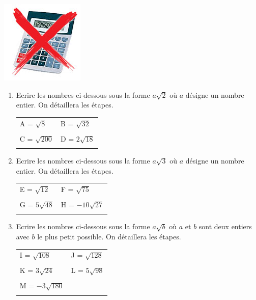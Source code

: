 
\begin{center}
\includegraphics[scale=0.2]{no_calculator}
\end{center}




\begin{exercice}
\begin{enumerate}
\item Ecrire les nombres ci-dessous sous la forme $a \sqrt{2}$  où $a$ désigne un nombre entier. On détaillera les étapes.\\

\begin{tabular}{m{3.8cm}m{3.5cm}}
A = $\sqrt{8}$ & B = $\sqrt{32}$\\
&\\
C = $\sqrt{200}$ & D = $2\sqrt{18}$\\
&\\

\end{tabular}

\item Ecrire les nombres ci-dessous sous la forme $a \sqrt{3}$  où $a$ désigne un nombre entier. On détaillera les étapes.

\begin{tabular}{m{3.8cm}m{3.5cm}}
E = $\sqrt{12}$ & F = $\sqrt{75}$\\
&\\
G = $5\sqrt{48}$ & H = $-10\sqrt{27}$\\
&\\

\end{tabular}

\item Ecrire les nombres ci-dessous sous la forme $a \sqrt{b}$  où $a$ et $b$ sont deux entiers avec $b$ le plus petit possible. On détaillera les étapes.

\begin{tabular}{m{3.8cm}m{3.5cm}}
I = $\sqrt{108}$ & J = $\sqrt{128}$\\
&\\
K = $3\sqrt{24}$ & L = $5\sqrt{98}$\\
&\\
M = $-3\sqrt{180}$ &\\
&\\
\end{tabular}
\end{enumerate}

\end{exercice}


